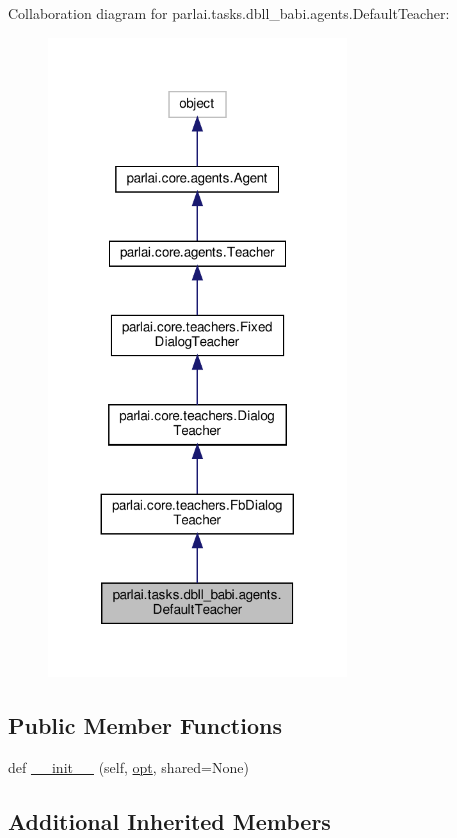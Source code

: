Collaboration diagram for parlai.\+tasks.\+dbll\+\_\+babi.\+agents.\+Default\+Teacher\+:
\nopagebreak
\begin{figure}[H]
\begin{center}
\leavevmode
\includegraphics[width=224pt]{classparlai_1_1tasks_1_1dbll__babi_1_1agents_1_1DefaultTeacher__coll__graph}
\end{center}
\end{figure}
\subsection*{Public Member Functions}
\begin{DoxyCompactItemize}
\item 
def \hyperlink{classparlai_1_1tasks_1_1dbll__babi_1_1agents_1_1DefaultTeacher_ab7d8ee5ef045a12162f79ec74898bca0}{\+\_\+\+\_\+init\+\_\+\+\_\+} (self, \hyperlink{classparlai_1_1core_1_1teachers_1_1FbDialogTeacher_af7a9ec497b9cd0292d7b8fa220da7c28}{opt}, shared=None)
\end{DoxyCompactItemize}
\subsection*{Additional Inherited Members}


